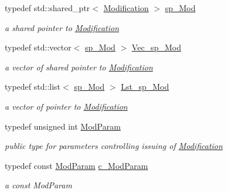 \begin{DoxyCompactItemize}
\mbox{\label{group___modification___t_y_p_e_s_ga9024cf2ead61a1280d29771b063b1a62}} 
typedef std\+::shared\+\_\+ptr$<$ \mbox{\hyperlink{class_s_m_spp__di__unipi__it_1_1_modification}{Modification}} $>$ \mbox{\hyperlink{group___modification___t_y_p_e_s_ga9024cf2ead61a1280d29771b063b1a62}{sp\+\_\+\+Mod}}
\begin{DoxyCompactList}\small\item\em a shared pointer to \mbox{\hyperlink{class_s_m_spp__di__unipi__it_1_1_modification}{Modification}} \end{DoxyCompactList}\item 
\mbox{\label{group___modification___t_y_p_e_s_ga877faafa15973eb552e53fec8208c54d}} 
typedef std\+::vector$<$ \mbox{\hyperlink{group___modification___t_y_p_e_s_ga9024cf2ead61a1280d29771b063b1a62}{sp\+\_\+\+Mod}} $>$ \mbox{\hyperlink{group___modification___t_y_p_e_s_ga877faafa15973eb552e53fec8208c54d}{Vec\+\_\+sp\+\_\+\+Mod}}
\begin{DoxyCompactList}\small\item\em a vector of shared pointer to \mbox{\hyperlink{class_s_m_spp__di__unipi__it_1_1_modification}{Modification}} \end{DoxyCompactList}\item 
\mbox{\label{group___modification___t_y_p_e_s_ga8a83b63d7963bc839660db495458f26d}} 
typedef std\+::list$<$ \mbox{\hyperlink{group___modification___t_y_p_e_s_ga9024cf2ead61a1280d29771b063b1a62}{sp\+\_\+\+Mod}} $>$ \mbox{\hyperlink{group___modification___t_y_p_e_s_ga8a83b63d7963bc839660db495458f26d}{Lst\+\_\+sp\+\_\+\+Mod}}
\begin{DoxyCompactList}\small\item\em a vector of pointer to \mbox{\hyperlink{class_s_m_spp__di__unipi__it_1_1_modification}{Modification}} \end{DoxyCompactList}\item 
typedef unsigned int \mbox{\hyperlink{group___modification___t_y_p_e_s_gac8fdf1a69f314970b9aaa9328e3f3907}{Mod\+Param}}
\begin{DoxyCompactList}\small\item\em public type for parameters controlling issuing of \mbox{\hyperlink{class_s_m_spp__di__unipi__it_1_1_modification}{Modification}} \end{DoxyCompactList}\item 
\mbox{\label{group___modification___t_y_p_e_s_ga544246d8c462e9a2d817c2c30797968f}} 
typedef const \mbox{\hyperlink{group___modification___t_y_p_e_s_gac8fdf1a69f314970b9aaa9328e3f3907}{Mod\+Param}} \mbox{\hyperlink{group___modification___t_y_p_e_s_ga544246d8c462e9a2d817c2c30797968f}{c\+\_\+\+Mod\+Param}}
\begin{DoxyCompactList}\small\item\em a const Mod\+Param \end{DoxyCompactList}\end{DoxyCompactItemize}
